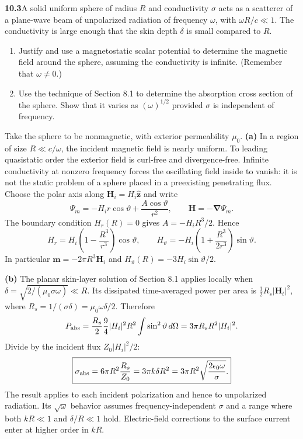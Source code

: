 \par\bigskip
\noindent\textbf{10.3}\quad A solid uniform sphere of radius $R$ and conductivity $\sigma$ acts as a scatterer of a plane-wave beam of unpolarized radiation of frequency $\omega$, with $\omega R/c\ll1$. The conductivity is large enough that the skin depth $\delta$ is small compared to $R$.
\begin{enumerate}
\item[(a)] Justify and use a magnetostatic scalar potential to determine the magnetic field around the sphere, assuming the conductivity is infinite. (Remember that $\omega\neq0$.)
\item[(b)] Use the technique of Section 8.1 to determine the absorption cross section of the sphere. Show that it varies as $(\omega)^{1/2}$ provided $\sigma$ is independent of frequency.
\end{enumerate}
\solution
Take the sphere to be nonmagnetic, with exterior permeability $\mu_0$.
\textbf{(a)} In a region of size $R\ll c/\omega$, the incident magnetic
field is nearly uniform. To leading quasistatic order the exterior field
is curl-free and divergence-free. Infinite conductivity at nonzero
frequency forces the oscillating field inside to vanish: it is not the
static problem of a sphere placed in a preexisting penetrating flux.
Choose the polar axis along $\mathbf H_i=H_i\widehat{\mathbf z}$ and write
\[
\Psi_m=-H_i r\cos\vartheta+\frac{A\cos\vartheta}{r^2},
\qquad \mathbf H=-\boldsymbol\nabla\Psi_m .
\]
The boundary condition $H_r(R)=0$ gives $A=-H_iR^3/2$. Hence
\[
H_r=H_i\left(1-\frac{R^3}{r^3}\right)\cos\vartheta,\qquad
H_\vartheta=-H_i\left(1+\frac{R^3}{2r^3}\right)\sin\vartheta .
\]
In particular $\mathbf m=-2\pi R^3\mathbf H_i$ and
$H_\vartheta(R)=-3H_i\sin\vartheta/2$.

\textbf{(b)} The planar skin-layer solution of Section 8.1 applies locally
when $\delta=\sqrt{2/(\mu_0\sigma\omega)}\ll R$.
Its dissipated time-averaged power per area is
$\tfrac12 R_s|\mathbf H_t|^2$, where
$R_s=1/(\sigma\delta)=\mu_0\omega\delta/2$.
Therefore
\[
P_{\rm abs}=\frac{R_s}{2}\frac94|H_i|^2R^2
\int\sin^2\vartheta\,d\Omega
=3\pi R_sR^2|H_i|^2 .
\]
Divide by the incident flux $Z_0|H_i|^2/2$:
\[
\boxed{\sigma_{\rm abs}=6\pi R^2\frac{R_s}{Z_0}
=3\pi k\delta R^2
=3\pi R^2\sqrt{\frac{2\epsilon_0\omega}{\sigma}}.}
\]
The result applies to each incident polarization and hence to unpolarized
radiation. Its $\sqrt\omega$ behavior assumes frequency-independent
$\sigma$ and a range where both $kR\ll1$ and $\delta/R\ll1$ hold.
Electric-field corrections to the surface current enter at higher order
in $kR$.

